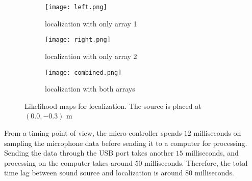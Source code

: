 \begin{figure}[h!]
  \centering
  \begin{subfigure}[]{.48\textwidth}
    \texttt{[image: left.png]}
    \caption{localization with only array 1}
    \label{fig:liklihood1}
  \end{subfigure}
  \begin{subfigure}[]{.48\textwidth}
    \texttt{[image: right.png]}
    \caption{localization with only array 2}
    \label{fig:liklihood2}
  \end{subfigure}
  \begin{subfigure}[]{.48\textwidth}
    \texttt{[image: combined.png]}
    \caption{localization with both arrays}
    \label{fig:liklihood3}
  \end{subfigure}
  \caption{Likelihood maps for localization. The source is placed at $(0.0,-0.3)$ m}
  \label{fig:liklihood}
\end{figure}

From a timing point of view, the micro-controller spends $12$ milliseconds on sampling the microphone data before sending it to a computer for processing. Sending the data through the USB port takes another $15$ milliseconds, and processing on the computer takes around $50$ milliseconds. Therefore, the total time lag between sound source and localization is around $80$ milliseconds.
